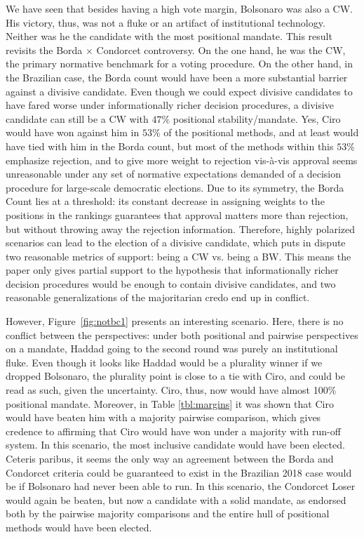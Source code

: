 \documentclass[hidelinks,11pt]{article} \usepackage[utf8]{inputenc}
\begin{document}
    We have seen that besides having a high vote margin, Bolsonaro was also
    a CW. His victory, thus, was not a fluke or an artifact of institutional
    technology. Neither was he the candidate with the most positional mandate.
    This result revisits the Borda \(\times\) Condorcet controversy. On the one
    hand, he was the CW, the primary normative benchmark for a voting procedure.
    On the other hand, in the Brazilian case, the Borda count would have been a
    more substantial barrier against a divisive candidate. Even though we could
    expect divisive candidates to have fared worse under informationally richer
    decision procedures, a divisive candidate can still be a CW with \(47\%\)
    positional stability/mandate. Yes, Ciro would have won against him in
    \(53\%\) of the positional methods, and at least would have tied with him in
    the Borda count, but most of the methods within this \(53\%\) emphasize
    rejection, and to give more weight to rejection vis-\`a-vis approval seems
    unreasonable under any set of normative expectations demanded of a decision
    procedure for large-scale democratic elections. Due to its symmetry, the
    Borda Count lies at a threshold: its constant decrease in assigning weights
    to the positions in the rankings guarantees that approval matters more than
    rejection, but without throwing away the rejection information. Therefore,
    highly polarized scenarios can lead to the election of a divisive candidate,
    which puts in dispute two reasonable metrics of support: being a CW vs.
    being a BW. This means the paper only gives partial support to the
    hypothesis that informationally richer decision procedures would be enough
    to contain divisive candidates, and two reasonable generalizations of the
    majoritarian credo end up in conflict.

    However, Figure~\ref{fig:notbc1} presents an interesting scenario. Here,
    there is no conflict between the perspectives: under both positional and
    pairwise perspectives on a mandate, Haddad going to the second round was
    purely an institutional fluke. Even though it looks like Haddad would be a
    plurality winner if we dropped Bolsonaro, the plurality point is close to a
    tie with Ciro, and could be read as such, given the uncertainty. Ciro, thus,
    now would have almost 100\(\%\) positional mandate. Moreover, in Table
    \ref{tbl:margins} it was shown that Ciro would have beaten him with a
    majority pairwise comparison, which gives credence to affirming that Ciro
    would have won under a majority with run-off system. In this scenario, the
    most inclusive candidate would have been elected. Ceteris paribus, it seems
    the only way an agreement between the Borda and Condorcet criteria could be
    guaranteed to exist in the Brazilian 2018 case would be if Bolsonaro had
    never been able to run. In this scenario, the Condorcet Loser would again be
    beaten, but now a candidate with a solid mandate, as endorsed both by the
    pairwise majority comparisons and the entire hull of positional methods
    would have been elected.
\end{document}
